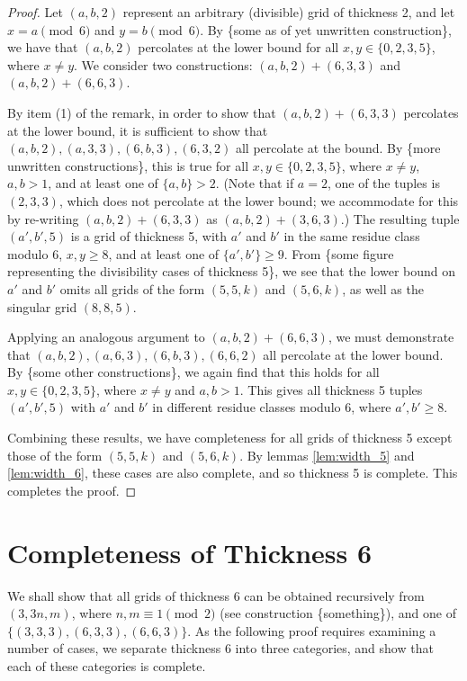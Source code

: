 \begin{proof}
Let $(a,b,2)$ represent an arbitrary (divisible) grid of thickness 2, and let $x = a \pmod 6$ and $y = b \pmod 6$. By \{some as of yet unwritten construction\}, we have that $(a,b,2)$ percolates at the lower bound for all $x,y \in \{0,2,3,5\}$, where $x \neq y$. We consider two constructions: $(a,b,2) + (6,3,3)$ and $(a,b,2) + (6,6,3)$. 

By item (1) of the remark, in order to show that $(a,b,2) + (6,3,3)$ percolates at the lower bound, it is sufficient to show that $(a,b,2), (a,3,3), (6,b,3), (6,3,2)$ all percolate at the bound. By \{more unwritten constructions\}, this is true for all $x,y \in \{0,2,3,5\}$, where $x \neq y$, $a,b > 1$, and at least one of $\{a,b\} > 2$. (Note that if $a=2$, one of the tuples is $(2,3,3)$, which does not percolate at the lower bound; we accommodate for this by re-writing $(a,b,2) + (6,3,3)$ as $(a,b,2) + (3,6,3)$.) The resulting tuple $(a', b', 5)$ is a grid of thickness 5, with $a'$ and $b'$ in the same residue class modulo $6$, $x,y \geq 8$, and at least one of $\{a',b'\} \geq 9$. From \{some figure representing the divisibility cases of thickness 5\}, we see that the lower bound on $a'$ and $b'$ omits all grids of the form $(5,5,k)$ and $(5,6,k)$, as well as the singular grid $(8,8,5)$. 

Applying an analogous argument to $(a,b,2) + (6,6,3)$, we must demonstrate that $(a,b,2), (a,6,3), (6,b,3), (6,6,2)$ all percolate at the lower bound. By \{some other constructions\}, we again find that this holds for all $x,y \in \{0,2,3,5\}$, where $x \neq y$ and $a,b > 1$. This gives all thickness 5 tuples $(a',b', 5)$ with $a'$ and $b'$ in different residue classes modulo $6$, where $a',b' \geq 8$. 

Combining these results, we have completeness for all grids of thickness 5 except those of the form $(5,5,k)$ and $(5,6,k)$. By lemmas \ref{lem:width_5} and \ref{lem:width_6}, these cases are also complete, and so thickness 5 is complete. This completes the proof. 
\end{proof}

\section{Completeness of Thickness 6}
We shall show that all grids of thickness 6 can be obtained recursively from $(3, 3n,m)$, where $n,m \equiv 1 \pmod 2$ (see construction \{something\}), and one of $\{(3,3,3), (6,3,3), (6,6,3)\}$. As the following proof requires examining a number of cases, we separate thickness 6 into three categories, and show that each of these categories is complete. 

